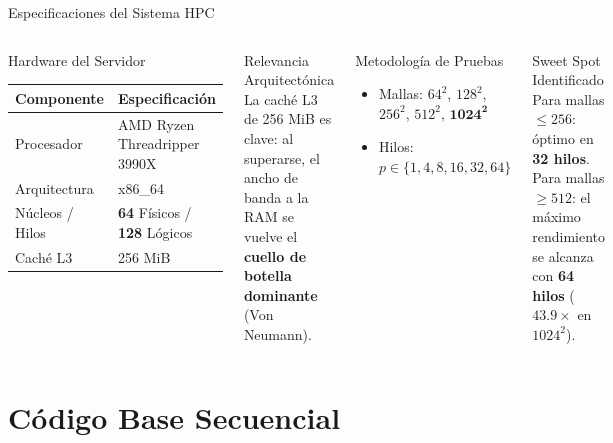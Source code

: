\documentclass[aspectratio=169,10pt,xcolor=table]{beamer}
\begin{document}
\begin{frame}{Especificaciones del Sistema HPC}
  \begin{columns}[c]
      \begin{block}{Hardware del Servidor}
        \renewcommand{\arraystretch}{0.9}
        \begin{tabular}{@{}ll@{}}
          \toprule
          \textbf{Componente} & \textbf{Especificación} \\
          \midrule
          Procesador & AMD Ryzen Threadripper 3990X \\
          Arquitectura & x86\_64 \\
          Núcleos / Hilos & \textbf{64} Físicos / \textbf{128} Lógicos \\
          Caché L3 & 256 MiB \\
          \bottomrule
        \end{tabular}
      \end{block}
      \vspace{0.2cm}
      \begin{block}{Relevancia Arquitectónica}
        La caché L3 de 256 MiB es clave: al superarse, el ancho de banda a la RAM se vuelve el \textbf{cuello de botella dominante} (Von Neumann).
      \end{block}
      \begin{block}{Metodología de Pruebas}
        \begin{itemize}
          \item Mallas: $64^2$, $128^2$, $256^2$, $512^2$, $\mathbf{1024^2}$
          \item Hilos:\\ $p \in \{1,4,8,16,32,64\}$
        \end{itemize}
      \end{block}
      \begin{alertblock}{Sweet Spot Identificado}
        Para mallas $\leq 256$: óptimo en \textbf{32 hilos}. Para mallas $\geq 512$: el máximo rendimiento se alcanza con \textbf{64 hilos} ($43.9\times$ en $1024^2$).
      \end{alertblock}
  \end{columns}
\end{frame}

\section{Código Base Secuencial}
\end{document}
